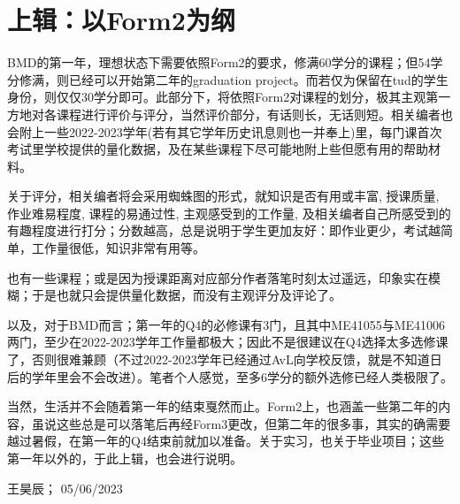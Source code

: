 \section{上辑：以Form2为纲}
BMD的第一年，理想状态下需要依照Form2的要求，修满60学分的课程；但54学分修满，则已经可以开始第二年的graduation project。而若仅为保留在tud的学生身份，则仅仅30学分即可。此部分下，将依照Form2对课程的划分，极其主观第一方地对各课程进行评价与评分，当然评价部分，有话则长，无话则短。相关编者也会附上一些2022-2023学年(若有其它学年历史讯息则也一并奉上)里，每门课首次考试里学校提供的量化数据，及在某些课程下尽可能地附上些但愿有用的帮助材料。

关于评分，相关编者将会采用蜘蛛图的形式，就知识是否有用或丰富, 授课质量, 作业难易程度, 课程的易通过性, 主观感受到的工作量, 及相关编者自己所感受到的有趣程度进行打分；分数越高，总是说明于学生更加友好：即作业更少，考试越简单，工作量很低，知识非常有用等。

也有一些课程；或是因为授课距离对应部分作者落笔时刻太过遥远，印象实在模糊；于是也就只会提供量化数据，而没有主观评分及评论了。

以及，对于BMD而言；第一年的Q4的必修课有3门，且其中ME41055与ME41006两门，至少在2022-2023学年工作量都极大；因此不是很建议在Q4选择太多选修课了，否则很难兼顾（不过2022-2023学年已经通过AvL向学校反馈，就是不知道日后的学年里会不会改进）。笔者个人感觉，至多6学分的额外选修已经人类极限了。

当然，生活并不会随着第一年的结束戛然而止。Form2上，也涵盖一些第二年的内容，虽说这些总是可以落笔后再经Form3更改，但第二年的很多事，其实的确需要越过暑假，在第一年的Q4结束前就加以准备。关于实习，也关于毕业项目；这些第一年以外的，于此上辑，也会进行说明。
\begin{flushright}
王昊辰； 05/06/2023
\end{flushright}








